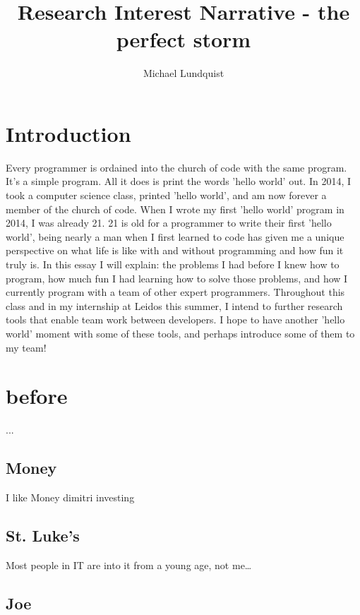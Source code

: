 \documentclass[titlepage]{article}
\author{Michael Lundquist}
\title{Research Interest Narrative - the perfect storm}
\begin{document}
\maketitle


\section{Introduction}

Every programmer is ordained into the church of code with the same program. It's a simple program. All it does is print the words 'hello world' out. In 2014, I took a computer science class, printed 'hello world', and am now forever a member of the church of code. When I wrote my first 'hello world' program in 2014, I was already 21. 21 is old for a programmer to write their first 'hello world', being nearly a man when I first learned to code has given me a unique perspective on what life is like with and without programming and how fun it truly is. In this essay I will explain: the problems I had before I knew how to program, how much fun I had learning how to solve those problems, and how I currently program with a team of other expert programmers. Throughout this class and in my internship at Leidos this summer, I intend to further research tools that enable team work between developers. I hope to have another 'hello world' moment with some of these tools, and perhaps introduce some of them to my team!

\section{before}

...

\subsection{Money}

I like Money
dimitri
investing

\subsection{St. Luke's}

Most people in IT are into it from a young age, not me\dots


\subsection{Joe}
\end{document}
